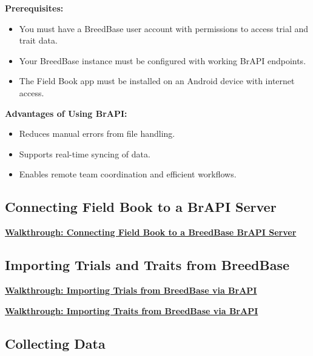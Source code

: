 \documentclass[
  12pt,
]{book}
\providecommand{\tightlist}{%
  \setlength{\itemsep}{0pt}\setlength{\parskip}{0pt}}
\begin{document}
\textbf{Prerequisites:}

\begin{itemize}
\tightlist
\item
  You must have a BreedBase user account with permissions to access trial and trait data.
\item
  Your BreedBase instance must be configured with working BrAPI endpoints.
\item
  The Field Book app must be installed on an Android device with internet access.
\end{itemize}

\textbf{Advantages of Using BrAPI:}

\begin{itemize}
\tightlist
\item
  Reduces manual errors from file handling.
\item
  Supports real-time syncing of data.
\item
  Enables remote team coordination and efficient workflows.
\end{itemize}

\hypertarget{connecting-field-book-to-a-brapi-server}{%
\subsection{Connecting Field Book to a BrAPI Server}\label{connecting-field-book-to-a-brapi-server}}

\href{https://scribehow.com/shared/Enable_BrAPI_for_Field_Book_using_the_Scannable_BrAPI_Configuration__SUXsC8xKQX-rLEG-4H6BIA}{\textbf{Walkthrough: Connecting Field Book to a BreedBase BrAPI Server}}

\hypertarget{importing-trials-and-traits-from-breedbase}{%
\subsection{Importing Trials and Traits from BreedBase}\label{importing-trials-and-traits-from-breedbase}}

\href{https://scribehow.com/shared/Import_Field_Trials_from_BreedBase_via_BrAPI__R4munb3fQ-OO5f-WAZRnKg}{\textbf{Walkthrough: Importing Trials from BreedBase via BrAPI}}

\href{https://scribehow.com/shared/Import_Traits_from_BreedBase_via_BrAPI__aqvmCO8QS_eziilPrntOoA?referrer=documents}{\textbf{Walkthrough: Importing Traits from BreedBase via BrAPI}}

\hypertarget{collecting-data}{%
\subsection{Collecting Data}\label{collecting-data}}
\end{document}
